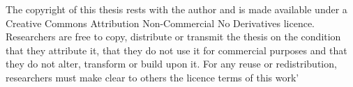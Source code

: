 
\cleardoublepage

{}

\begin{copyrightdecl}

The copyright of this thesis rests with the author and is made available under a Creative Commons Attribution Non-Commercial No Derivatives licence. 
Researchers are free to copy, distribute or transmit the thesis on the condition that they attribute it, that they do not use it for commercial purposes and that they do not alter, transform or build upon it. 
For any reuse or redistribution, researchers must make clear to others the licence terms of this work’

\end{copyrightdecl}
